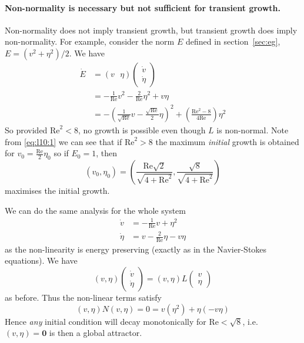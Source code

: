 \documentclass{jknotes}
\newcommand{\ReN}{\text{Re}}
\begin{document}
\paragraph{Non-normality is necessary but not sufficient for transient
growth.}
Non-normality does not imply transient growth, but transient growth does imply
non-normality. For example, consider the norm $E$ defined in
section~\ref{sec:eg}, $E = (v^2 + \eta^2)/2$. We have
\begin{align}
	\dot{E} &= \left(v \,\,\,\, \eta\right) \begin{pmatrix} \dot{v} \\
	\dot{\eta} \end{pmatrix} \\
			&= -\frac{1}{\ReN} v^2 - \frac{2}{\ReN} \eta^2 + v \eta \\
			&= -\left(\frac{1}{\sqrt{\ReN}} v - \frac{\sqrt{\ReN}}{2} \eta
			\right)^2 + \left(\frac{\ReN^2 - 8}{4\ReN}\right) \eta^2
			\label{eq:l10:1}
\end{align}
So provided $\ReN^2 < 8$, no growth is possible even though $L$ is non-normal.
Note from \eqref{eq:l10:1} we can see that if $\ReN^2 > 8$ the maximum
\emph{initial} growth is obtained for $v_0 = \frac{\ReN}{2}\eta_0$ so if $E_0
=1$, then
\begin{equation}
	(v_0, \eta_0) = \left( \frac{\ReN\sqrt{2}}{\sqrt{4+\ReN^2}},
	\frac{\sqrt{8}}{\sqrt{4+\ReN^2}}\right)
\end{equation}
maximises the initial growth.

We can do the same analysis for the whole system
\begin{align}
	\dot{v} &= -\frac{1}{\ReN} v + \eta^2 \\
	\dot{\eta} &= v - \frac{2}{\ReN} \eta - v \eta
\end{align}
as the non-linearity is energy preserving (exactly as in the Navier-Stokes
equations). We have
\begin{equation}
	(v, \eta) \begin{pmatrix} \dot{v} \\ \dot{\eta} \end{pmatrix} 
	= (v, \eta) L \begin{pmatrix} v \\ \eta \end{pmatrix}
\end{equation}
as before. Thus the non-linear terms satisfy
\begin{equation}
	(v, \eta) N(v, \eta) = 0 = v(\eta^2) + \eta(-v\eta)
\end{equation}
Hence \emph{any} initial condition will decay monotonically for $\ReN <
\sqrt{8}$, i.e. $(v, \eta) = \symbf{0}$ is then a global attractor.
\end{document}
